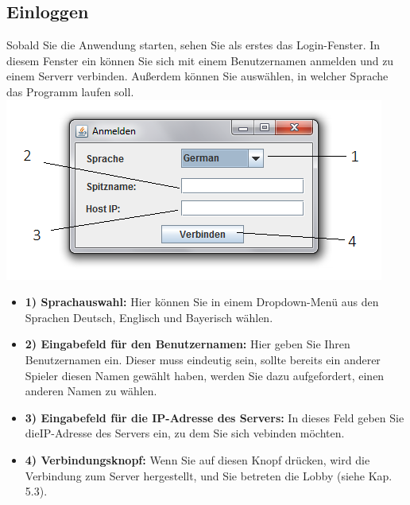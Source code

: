 \documentclass[titlepage,10pt,a4paper]{article}
\begin{document}
\subsection{Einloggen}
Sobald Sie die Anwendung starten, sehen Sie als erstes das Login-Fenster. In diesem Fenster ein können Sie sich mit einem Benutzernamen anmelden und zu einem \gls{Server}r verbinden. Außerdem können Sie auswählen, in welcher Sprache das Programm laufen soll.\\
\includegraphics[width=\textwidth]{Login-Fenster}
\begin{itemize}
	\item \textbf{1) Sprachauswahl:} Hier können Sie in einem Dropdown-Menü aus den Sprachen Deutsch, Englisch und Bayerisch wählen.
	\item \textbf{2) Eingabefeld für den Benutzernamen:} Hier geben Sie Ihren Benutzernamen ein. Dieser muss eindeutig sein, sollte bereits ein anderer Spieler diesen Namen gewählt haben, werden Sie dazu aufgefordert, einen anderen Namen zu wählen.
	\item \textbf{3) Eingabefeld für die \gls{IP-Adresse} des \gls{Server}s:} In dieses Feld geben Sie die\gls{IP-Adresse} des \gls{Server}s ein, zu dem Sie sich vebinden möchten.
	\item \textbf{4) Verbindungsknopf:} Wenn Sie auf diesen Knopf drücken, wird die Verbindung zum \gls{Server} hergestellt, und Sie betreten die \gls{Lobby} (siehe Kap. 5.3).
\end{itemize}
\end{document}
